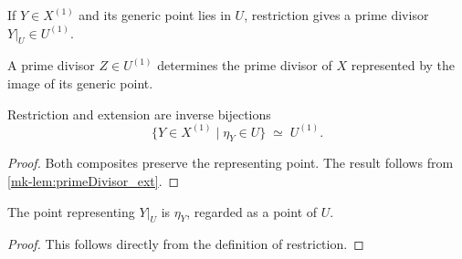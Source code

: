 \begin{definition}
  \label{mk-def:primeDivisor_restrictToOpen}
  \leanok


  If \(Y\in X^{(1)}\) and its generic point lies in \(U\), restriction gives
  a prime divisor \(Y|_U\in U^{(1)}\).
\end{definition}

\begin{definition}
  \label{mk-def:primeDivisor_ofOpen}
  \leanok


  A prime divisor \(Z\in U^{(1)}\) determines the prime divisor of \(X\)
  represented by the image of its generic point.
\end{definition}

\begin{lemma}
  \label{mk-lem:primeDivisor_equivOpen}
  \leanok


  Restriction and extension are inverse bijections
  \[
    \{Y\in X^{(1)}\mid \eta_Y\in U\}\;\simeq\;U^{(1)}.
  \]
\end{lemma}
\begin{proof}
  \leanok
  Both composites preserve the representing point.  The result follows from
  \ref{mk-lem:primeDivisor_ext}.
\end{proof}

\begin{lemma}
  \label{mk-lem:primeDivisor_restrictToOpen_point}
  \leanok


  The point representing \(Y|_U\) is \(\eta_Y\), regarded as a point of \(U\).
\end{lemma}
\begin{proof}
  \leanok
  This follows directly from the definition of restriction.
\end{proof}

